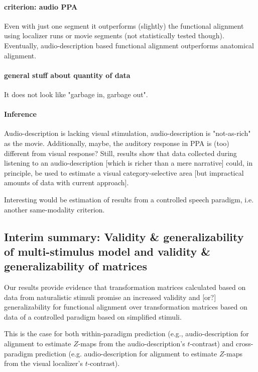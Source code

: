 \paragraph{criterion: audio PPA}
%
Even with just one segment it outperforms (slightly) the functional alignment
using localizer runs or movie segments (not statistically tested though).
%
Eventually, audio-description based functional alignment outperforms anatomical
alignment.


\paragraph{general stuff about quantity of data}
%
It does not look like "garbage in, garbage out".

\paragraph{Inference}


%
Audio-description is lacking visual stimulation, audio-description is
"not-as-rich" as the movie.
%
Additionally, maybe, the auditory response in PPA is (too) different from visual
response?
%
Still, results show that data collected during listening to an audio-description
[which is richer than a mere narrative] could, in principle, be used to estimate
a visual category-selective area [but impractical amounts of data with current
approach].

%
Interesting would be estimation of results from a controlled speech
paradigm, i.e. another same-modality criterion.


\subsection{Interim summary: Validity \& generalizability of multi-stimulus
model and validity \& generalizability of matrices}


%
Our results provide evidence that transformation matrices calculated based on
data from naturalistic stimuli promise an increased validity and [or?]
generalizability for functional alignment over transformation matrices based on
data of a controlled paradigm based on simplified stimuli.



%
This is the case for both within-paradigm prediction (e.g., audio-description
for alignment to estimate $Z$-maps from the audio-description's $t$-contrast)
and cross-paradigm prediction (e.g. audio-description for alignment to estimate
$Z$-maps from the visual localizer's $t$-contrast).

